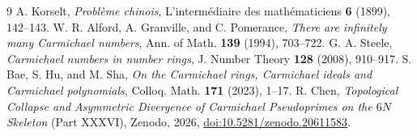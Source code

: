 \documentclass[11pt]{article}
\begin{document}
\begin{thebibliography}{9}
 A. Korselt, \emph{Probl\`eme chinois}, L'interm\'ediaire des math\'ematiciens
\textbf{6} (1899), 142--143.
 W. R. Alford, A. Granville, and C. Pomerance, \emph{There are infinitely many Carmichael
numbers}, Ann. of Math. \textbf{139} (1994), 703--722.
 G. A. Steele, \emph{Carmichael numbers in number rings}, J. Number Theory
\textbf{128} (2008), 910--917.
 S. Bae, S. Hu, and M. Sha, \emph{On the Carmichael rings, Carmichael ideals and
Carmichael polynomials}, Colloq. Math. \textbf{171} (2023), 1--17.
 R. Chen, \emph{Topological Collapse and Asymmetric Divergence of Carmichael Pseudoprimes
on the $6N$ Skeleton} (Part XXXVI), Zenodo, 2026,
\href{https://doi.org/10.5281/zenodo.20611583}{doi:10.5281/zenodo.20611583}.
\end{thebibliography}
\end{document}
